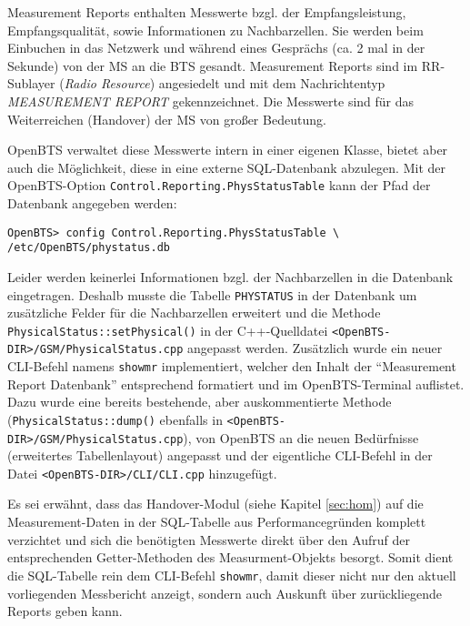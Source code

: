 Measurement Reports enthalten Messwerte bzgl. der Empfangsleistung, Empfangsqualität, sowie Informationen zu Nachbarzellen. Sie werden beim Einbuchen in das Netzwerk und während eines Gesprächs (ca. 2 mal in der Sekunde) von der MS an die BTS gesandt. Measurement Reports sind im RR-Sublayer (\textit{Radio Resource}) angesiedelt und mit dem Nachrichtentyp \textit{MEASUREMENT REPORT} gekennzeichnet. Die Messwerte sind für das Weiterreichen (Handover) der MS von großer Bedeutung.

OpenBTS verwaltet diese Messwerte intern in einer eigenen Klasse, bietet aber auch die Möglichkeit, diese in eine externe SQL-Datenbank abzulegen. Mit der OpenBTS-Option \verb|Control.Reporting.PhysStatusTable| kann der Pfad der Datenbank angegeben werden:
\begin{verbatim}
OpenBTS> config Control.Reporting.PhysStatusTable \
/etc/OpenBTS/phystatus.db
\end{verbatim}

Leider werden keinerlei Informationen bzgl. der Nachbarzellen in die Datenbank eingetragen. Deshalb musste die Tabelle \verb|PHYSTATUS| in der Datenbank um zusätzliche Felder für die Nachbarzellen erweitert und die Methode \verb|PhysicalStatus::setPhysical()| in der C++-Quelldatei \verb|<OpenBTS-DIR>/GSM/PhysicalStatus.cpp| angepasst werden.
Zusätzlich wurde ein neuer CLI-Befehl namens \verb|showmr| implementiert, welcher den Inhalt der "`Measurement Report Datenbank"' entsprechend formatiert und im OpenBTS-Terminal auflistet. Dazu wurde eine bereits bestehende, aber auskommentierte Methode (\verb|PhysicalStatus::dump()| ebenfalls in \verb|<OpenBTS-DIR>/GSM/PhysicalStatus.cpp|), von OpenBTS an die neuen Bedürfnisse (erweitertes Tabellenlayout) angepasst und der eigentliche CLI-Befehl in der Datei \verb|<OpenBTS-DIR>/CLI/CLI.cpp| hinzugefügt.

Es sei erwähnt, dass das Handover-Modul (siehe Kapitel \ref{sec:hom}) auf die Measurement-Daten in der SQL-Tabelle  aus Performancegründen komplett verzichtet und sich die benötigten Messwerte direkt über den Aufruf der entsprechenden Getter-Methoden des Measurment-Objekts besorgt. Somit dient die SQL-Tabelle rein dem CLI-Befehl \verb|showmr|, damit dieser nicht nur den aktuell vorliegenden Messbericht anzeigt, sondern auch Auskunft über zurückliegende Reports geben kann.

